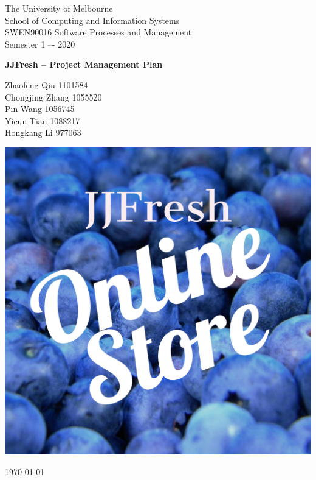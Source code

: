 \documentclass{report}
\begin{document}
\begin{titlepage}
	\clearpage\thispagestyle{empty}
	\centering
	\vspace{1cm}

	{\normalsize The University of Melbourne \\ 
		School of Computing and Information Systems \\
		SWEN90016 Software Processes and Management\\
		Semester 1 –- 2020 \par}
		\vspace{3cm}
	{\Huge \textbf{JJFresh -- Project Management Plan}} \\
	\vspace{4cm}
	{\normalsize Zhaofeng Qiu 1101584\\ %
	             Chongjing Zhang 1055520\\
	             Pin Wang 1056745 \\
	             Yicun Tian 1088217 \\
	             Hongkang Li 977063\par}
	\vspace{4cm}
    
    \centering \includegraphics[scale=0.1]{logo.pdf}
    
    \vspace{0.5cm}
		
	{\normalsize \today \par}
	\pagebreak
\end{titlepage}
\end{document}
